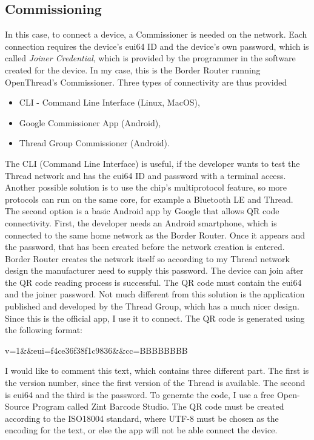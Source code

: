 \subsection{Commissioning}
In this case, to connect a device, a Commissioner is needed on the network. Each connection requires the device's eui64 ID and the device's own password, which is called \textit{Joiner Credential}, which is provided by the programmer in the software created for the device. In my case, this is the Border Router running OpenThread's Commissioner.
Three types of connectivity are thus provided
\begin{itemize}
    \item CLI - Command Line Interface (Linux, MacOS),
    \item Google Commissioner App (Android),
    \item Thread Group Commissioner (Android).
\end{itemize}
The CLI (Command Line Interface) is useful, if the developer wants to test the Thread network and has the eui64 ID and password with a terminal access. Another possible solution is to use the chip's multiprotocol feature, so more protocols can run on the same core, for example a Bluetooth LE and Thread. The second option is a basic Android app by Google that allows QR code connectivity. First, the developer needs an Android smartphone, which is connected to the same home network as the Border Router. Once it appears and the password, that has been created before the network creation is entered. Border Router creates the network itself so according to my Thread network design the manufacturer need to supply this password. The device can join after the QR code reading process is successful. The QR code must contain the eui64 and the joiner password.
\newline
Not much different from this solution is the application published and developed by the Thread Group, which has a much nicer design. Since this is the official app, I use it to connect.
The QR code is generated using the following format:
\begin{center}
    v=1\&\&eui=f4ce36f38f1c9836\&\&cc=BBBBBBBB    
\end{center}
I would like to comment this text, which contains three different part. The first is the version number, since the first version of the Thread is available. The second is eui64 and the third is the password. To generate the code, I use a free Open-Source Program called Zint Barcode Studio\cite{zintdownload}. The QR code must be created according to the ISO18004 standard, where UTF-8 must be chosen as the encoding for the text, or else the app will not be able connect the device.
